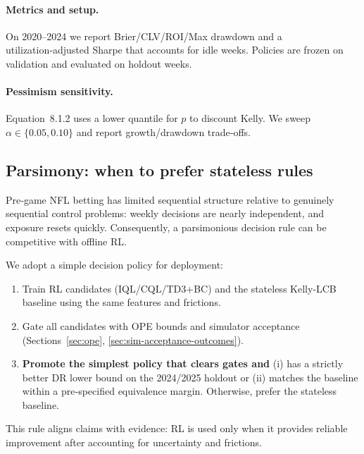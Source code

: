 \paragraph{Metrics and setup.} On 2020--2024 we report Brier/CLV/ROI/Max drawdown and a utilization‑adjusted Sharpe that accounts for idle weeks. Policies are frozen on validation and evaluated on holdout weeks.


\paragraph{Pessimism sensitivity.} Equation~8.1.2 uses a lower quantile for $p$ to discount Kelly. We sweep $\alpha\in\{0.05,0.10\}$ and report growth/drawdown trade‑offs.

\subsection{Parsimony: when to prefer stateless rules}\label{sec:parsimonious-choice}
Pre‑game NFL betting has limited sequential structure relative to genuinely sequential control problems: weekly decisions are nearly independent, and exposure resets quickly. Consequently, a parsimonious decision rule can be competitive with offline RL.

We adopt a simple decision policy for deployment:
\begin{enumerate}
  \item Train RL candidates (IQL/CQL/TD3+BC) and the stateless Kelly‑LCB baseline using the same features and frictions.
  \item Gate all candidates with OPE bounds and simulator acceptance (Sections~\ref{sec:ope}, \ref{sec:sim-acceptance-outcomes}).
  \item \textbf{Promote the simplest policy that clears gates and} (i) has a strictly better DR lower bound on the 2024/2025 holdout or (ii) matches the baseline within a pre‑specified equivalence margin. Otherwise, prefer the stateless baseline.
\end{enumerate}
This rule aligns claims with evidence: RL is used only when it provides reliable improvement after accounting for uncertainty and frictions.

